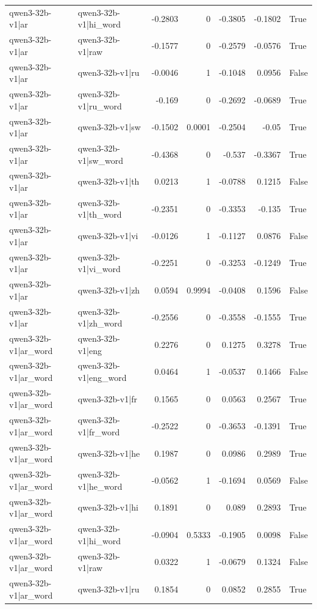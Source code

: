 \begin{table}
\begin{tabular}{l l r r r r l}
qwen3-32b-v1|ar & qwen3-32b-v1|hi_word & -0.2803 & 0 & -0.3805 & -0.1802 & True \\
qwen3-32b-v1|ar & qwen3-32b-v1|raw & -0.1577 & 0 & -0.2579 & -0.0576 & True \\
qwen3-32b-v1|ar & qwen3-32b-v1|ru & -0.0046 & 1 & -0.1048 & 0.0956 & False \\
qwen3-32b-v1|ar & qwen3-32b-v1|ru_word & -0.169 & 0 & -0.2692 & -0.0689 & True \\
qwen3-32b-v1|ar & qwen3-32b-v1|sw & -0.1502 & 0.0001 & -0.2504 & -0.05 & True \\
qwen3-32b-v1|ar & qwen3-32b-v1|sw_word & -0.4368 & 0 & -0.537 & -0.3367 & True \\
qwen3-32b-v1|ar & qwen3-32b-v1|th & 0.0213 & 1 & -0.0788 & 0.1215 & False \\
qwen3-32b-v1|ar & qwen3-32b-v1|th_word & -0.2351 & 0 & -0.3353 & -0.135 & True \\
qwen3-32b-v1|ar & qwen3-32b-v1|vi & -0.0126 & 1 & -0.1127 & 0.0876 & False \\
qwen3-32b-v1|ar & qwen3-32b-v1|vi_word & -0.2251 & 0 & -0.3253 & -0.1249 & True \\
qwen3-32b-v1|ar & qwen3-32b-v1|zh & 0.0594 & 0.9994 & -0.0408 & 0.1596 & False \\
qwen3-32b-v1|ar & qwen3-32b-v1|zh_word & -0.2556 & 0 & -0.3558 & -0.1555 & True \\
qwen3-32b-v1|ar_word & qwen3-32b-v1|eng & 0.2276 & 0 & 0.1275 & 0.3278 & True \\
qwen3-32b-v1|ar_word & qwen3-32b-v1|eng_word & 0.0464 & 1 & -0.0537 & 0.1466 & False \\
qwen3-32b-v1|ar_word & qwen3-32b-v1|fr & 0.1565 & 0 & 0.0563 & 0.2567 & True \\
qwen3-32b-v1|ar_word & qwen3-32b-v1|fr_word & -0.2522 & 0 & -0.3653 & -0.1391 & True \\
qwen3-32b-v1|ar_word & qwen3-32b-v1|he & 0.1987 & 0 & 0.0986 & 0.2989 & True \\
qwen3-32b-v1|ar_word & qwen3-32b-v1|he_word & -0.0562 & 1 & -0.1694 & 0.0569 & False \\
qwen3-32b-v1|ar_word & qwen3-32b-v1|hi & 0.1891 & 0 & 0.089 & 0.2893 & True \\
qwen3-32b-v1|ar_word & qwen3-32b-v1|hi_word & -0.0904 & 0.5333 & -0.1905 & 0.0098 & False \\
qwen3-32b-v1|ar_word & qwen3-32b-v1|raw & 0.0322 & 1 & -0.0679 & 0.1324 & False \\
qwen3-32b-v1|ar_word & qwen3-32b-v1|ru & 0.1854 & 0 & 0.0852 & 0.2855 & True \\

\end{tabular}
\end{table}
